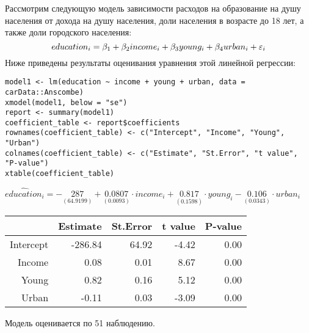 \begin{problem} %
 Рассмотрим следующую модель зависимости расходов на образование на душу населения от дохода на душу населения, доли населения в возрасте до 18 лет, а также доли городского населения:
\[
education_i = \beta_1 + \beta_2 income_i + \beta_3 young_i + \beta_4 urban_i + \varepsilon_i
\]
Ниже приведены результаты оценивания уравнения этой линейной регрессии:

\begin{verbatim}
model1 <- lm(education ~ income + young + urban, data = carData::Anscombe)
xmodel(model1, below = "se")
report <- summary(model1)
coefficient_table <- report$coefficients
rownames(coefficient_table) <- c("Intercept", "Income", "Young", "Urban")
colnames(coefficient_table) <- c("Estimate", "St.Error", "t value", "P-value")
xtable(coefficient_table)
\end{verbatim}

\ensuremath{\widehat{education}_i=-\underset{( 64.9199 )}{ 287 }+\underset{( 0.0093)}{0.0807}\cdot income_i+\underset{( 0.1598)}{0.817}\cdot young_i-\underset{( 0.0343)}{0.106}\cdot urban_i}


\begin{center}
\begin{tabular}{rrrrr}
  \hline
 & Estimate & St.Error & t value & P-value \\
  \hline
Intercept & -286.84 & 64.92 & -4.42 & 0.00 \\
  Income & 0.08 & 0.01 & 8.67 & 0.00 \\
  Young & 0.82 & 0.16 & 5.12 & 0.00 \\
  Urban & -0.11 & 0.03 & -3.09 & 0.00 \\
   \hline
\end{tabular}
\end{center}

Модель оценивается по 51 наблюдению.


\end{problem}

